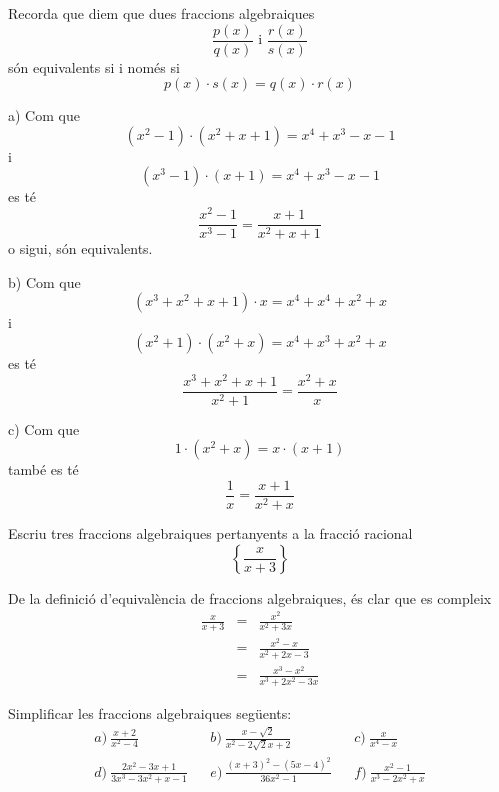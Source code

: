 \begin{solucio}
Recorda que diem que dues fraccions algebraiques\[
\frac{p(x)}{q(x)}\text{ \ \ \ i \ \ \ }\frac{r(x)}{s(x)}
\]són equivalents si i només si\[
p(x)\cdot s(x)=q(x)\cdot r(x)
\]

a) Com que\[
\left( x^{2}-1\right) \cdot \left( x^{2}+x+1\right) =x^{4}+x^{3}-x-1
\]i\[
\left( x^{3}-1\right) \cdot \left( x+1\right) =x^{4}+x^{3}-x-1
\]es té
\[
\frac{x^{2}-1}{x^{3}-1}=\frac{x+1}{x^{2}+x+1}
\]o sigui, són equivalents.

b) Com que\[
\left( x^{3}+x^{2}+x+1\right) \cdot x=x^{4}+x^{4}+x^{2}+x
\]i\[
\left( x^{2}+1\right) \cdot \left( x^{2}+x\right) =x^{4}+x^{3}+x^{2}+x
\]es té\[
\frac{x^{3}+x^{2}+x+1}{x^{2}+1}=\frac{x^{2}+x}{x}
\]

c) Com que\[
1\cdot \left( x^{2}+x\right) =x\cdot (x+1)
\]també es té\[
\frac{1}{x}=\frac{x+1}{x^{2}+x}
\]
\end{solucio}

\begin{exercici}
Escriu tres fraccions algebraiques pertanyents a la fracció
racional\[
\left\{ \frac{x}{x+3}\right\}
\]
\end{exercici}

\begin{solucio}
De la definició d'equivalència de fraccions algebraiques, és clar que
es compleix\begin{eqnarray*}
\frac{x}{x+3} &=&\frac{x^{2}}{x^{2}+3x} \\
&=&\frac{x^{2}-x}{x^{2}+2x-3} \\
&=&\frac{x^{3}-x^{2}}{x^{3}+2x^{2}-3x}
\end{eqnarray*}
\end{solucio}

\begin{exercici}
Simplificar les fraccions algebraiques següents:\[
\begin{array}{lllll}
a)~\frac{x+2}{x^{2}-4} & & b)~\frac{x-\sqrt{2}}{x^{2}-2\sqrt{2}x+2} & & c)~\frac{x}{x^{4}-x} \\
d)~\frac{2x^{2}-3x+1}{3x^{3}-3x^{2}+x-1} & & e)~\frac{(x+3)^{2}-(5x-4)^{2}}{36x^{2}-1} & & f)~\frac{x^{2}-1}{x^{3}-2x^{2}+x}\end{array}\]
\end{exercici}

